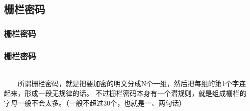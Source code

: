 \documentclass[slidestop,compress,mathserif]{beamer}
\begin{document}
%
%
%


\subsection{\hfill 栅栏密码}
\begin{frame}
  \frametitle{栅栏密码}
\end{frame}
\begin{frame}
  \frametitle{栅栏密码}
  ~\\[1.6cm]
    ~~~~所谓栅栏密码，就是把要加密的明文分成N个一组，然后把每组的第1个字连起来，形成一段无规律的话。 不过栅栏密码本身有一个潜规则，就是组成栅栏的字母一般不会太多。（一般不超过30个，也就是一、两句话）
\end{frame}

\end{document}
